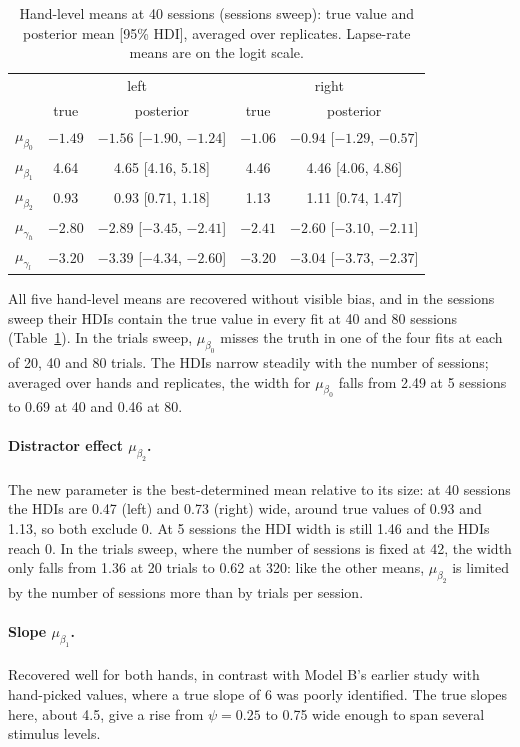\documentclass[11pt]{article}
\begin{document}
\begin{table}[H]
\centering
\caption{Hand-level means at 40 sessions (sessions sweep): true value and posterior
mean [95\% HDI], averaged over replicates. Lapse-rate means are on the logit scale.}
\label{tab:means40}
\begin{tabular}{lcccc}
\toprule
 & \multicolumn{2}{c}{left} & \multicolumn{2}{c}{right} \\
 & true & posterior & true & posterior \\
\midrule
$\mu_{\beta_0}$ & $-1.49$ & $-1.56$ [$-1.90$, $-1.24$] & $-1.06$ & $-0.94$ [$-1.29$, $-0.57$] \\
$\mu_{\beta_1}$ & 4.64 & 4.65 [4.16, 5.18] & 4.46 & 4.46 [4.06, 4.86] \\
$\mu_{\beta_2}$ & 0.93 & 0.93 [0.71, 1.18] & 1.13 & 1.11 [0.74, 1.47] \\
$\mu_{\gamma_h}$ & $-2.80$ & $-2.89$ [$-3.45$, $-2.41$] & $-2.41$ & $-2.60$ [$-3.10$, $-2.11$] \\
$\mu_{\gamma_l}$ & $-3.20$ & $-3.39$ [$-4.34$, $-2.60$] & $-3.20$ & $-3.04$ [$-3.73$, $-2.37$] \\
\bottomrule
\end{tabular}
\end{table}

All five hand-level means are recovered without visible bias, and in the sessions sweep
their HDIs contain the true value in every fit at 40 and 80 sessions
(Table~\ref{tab:means40}). In the trials sweep, $\mu_{\beta_0}$ misses the truth in
one of the four fits at each of 20, 40 and 80 trials. The
HDIs narrow steadily with the number of sessions; averaged over hands and replicates,
the width for $\mu_{\beta_0}$ falls from 2.49 at 5 sessions to 0.69 at 40 and 0.46 at
80.

\paragraph{Distractor effect $\mu_{\beta_2}$.} The new parameter is the
best-determined mean relative to its size: at 40 sessions the HDIs are 0.47 (left)
and 0.73 (right) wide, around true values of 0.93 and 1.13, so both exclude 0. At 5
sessions the HDI width is still 1.46 and the HDIs reach 0. In the trials
sweep, where the number of sessions is fixed at 42, the width only falls from 1.36
at 20 trials to 0.62 at 320: like the other means, $\mu_{\beta_2}$ is limited by the
number of sessions more than by trials per session.

\paragraph{Slope $\mu_{\beta_1}$.} Recovered well for both hands, in contrast with
Model B's earlier study with hand-picked values, where a true slope of 6 was poorly identified. The
true slopes here, about 4.5, give a rise from $\psi = 0.25$ to 0.75 wide enough to span
several stimulus levels.
\end{document}
